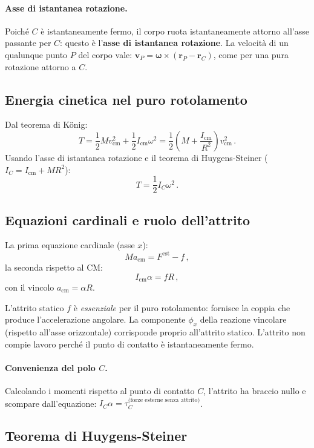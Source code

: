 \documentclass[11pt,a4paper]{article}
\renewcommand{\vec}[1]{\bm{#1}}
\newcommand{\om}{\vec{\omega}}
\newcommand{\CM}{\mathrm{cm}}
\theoremstyle{plain}
\theoremstyle{definition}
\theoremstyle{remark}
\begin{document}
\paragraph{Asse di istantanea rotazione.}
Poiché $C$ è istantaneamente fermo, il corpo ruota istantaneamente attorno
all'asse passante per $C$: questo è l'\textbf{asse di istantanea rotazione}.
La velocità di un qualunque punto $P$ del corpo vale:
$\vec{v}_P=\om\times(\vec{r}_P-\vec{r}_C)$, come per una pura rotazione
attorno a $C$.

\subsection{Energia cinetica nel puro rotolamento}

Dal teorema di König:
\[
  T=\frac{1}{2}Mv_\CM^2+\frac{1}{2}I_\CM\omega^2
   =\frac{1}{2}\!\left(M+\frac{I_\CM}{R^2}\right)v_\CM^2\,.
\]
Usando l'asse di istantanea rotazione e il teorema di Huygens-Steiner
($I_C=I_\CM+MR^2$):
\[
  T=\frac{1}{2}I_C\omega^2\,.
\]

\subsection{Equazioni cardinali e ruolo dell'attrito}

La prima equazione cardinale (asse $x$):
\[
  Ma_\CM=F^\mathrm{est}-f\,,
\]
la seconda rispetto al CM:
\[
  I_\CM\alpha=fR\,,
\]
con il vincolo $a_\CM=\alpha R$.

L'attrito statico $f$ è \emph{essenziale} per il puro rotolamento: fornisce
la coppia che produce l'accelerazione angolare. La componente $\phi_x$ della
reazione vincolare (rispetto all'asse orizzontale) corrisponde proprio
all'attrito statico. L'attrito non compie lavoro perché il punto di contatto
è istantaneamente fermo.

\paragraph{Convenienza del polo $C$.}
Calcolando i momenti rispetto al punto di contatto $C$, l'attrito ha braccio
nullo e scompare dall'equazione:
$I_C\alpha=\tau_C^\text{(forze esterne senza attrito)}$.

\subsection{Teorema di Huygens-Steiner}
\end{document}
